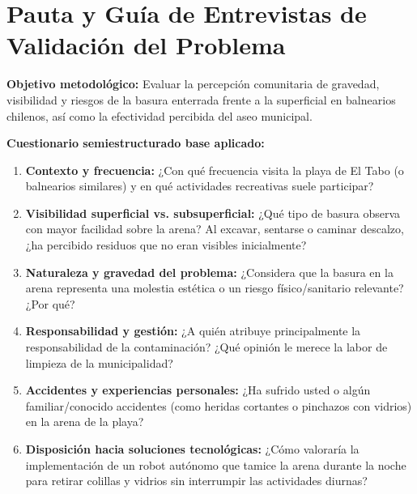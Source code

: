\documentclass[12pt,letterpaper]{article}
\begin{document}
\clearpage

\section{Pauta y Guía de Entrevistas de Validación del Problema}
\label{anexo:guia_entrevistas}

\noindent\textbf{Objetivo metodológico:} Evaluar la percepción comunitaria de gravedad, visibilidad y riesgos de la basura enterrada frente a la superficial en balnearios chilenos, así como la efectividad percibida del aseo municipal.

\vspace{0.2cm}
\noindent\textbf{Cuestionario semiestructurado base aplicado:}
\begin{enumerate}[leftmargin=*]
    \item \textbf{Contexto y frecuencia:} ¿Con qué frecuencia visita la playa de El Tabo (o balnearios similares) y en qué actividades recreativas suele participar?
    \item \textbf{Visibilidad superficial vs. subsuperficial:} ¿Qué tipo de basura observa con mayor facilidad sobre la arena? Al excavar, sentarse o caminar descalzo, ¿ha percibido residuos que no eran visibles inicialmente?
    \item \textbf{Naturaleza y gravedad del problema:} ¿Considera que la basura en la arena representa una molestia estética o un riesgo físico/sanitario relevante? ¿Por qué?
    \item \textbf{Responsabilidad y gestión:} ¿A quién atribuye principalmente la responsabilidad de la contaminación? ¿Qué opinión le merece la labor de limpieza de la municipalidad?
    \item \textbf{Accidentes y experiencias personales:} ¿Ha sufrido usted o algún familiar/conocido accidentes (como heridas cortantes o pinchazos con vidrios) en la arena de la playa?
    \item \textbf{Disposición hacia soluciones tecnológicas:} ¿Cómo valoraría la implementación de un robot autónomo que tamice la arena durante la noche para retirar colillas y vidrios sin interrumpir las actividades diurnas?
\end{enumerate}

\end{document}

